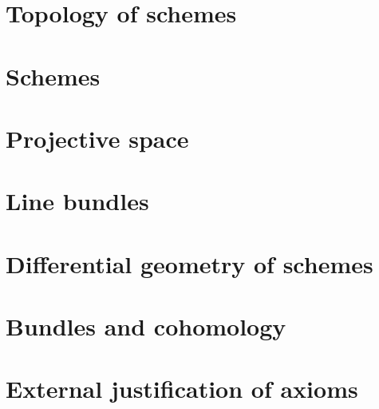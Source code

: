 \documentclass{zariski}
\begin{document}
\section{Topology of schemes}


\section{Schemes}


\section{Projective space}


\section{Line bundles}


\section{Differential geometry of schemes}


\section{Bundles and cohomology}


\section{External justification of axioms}


\printindex

\printbibliography
\end{document}

